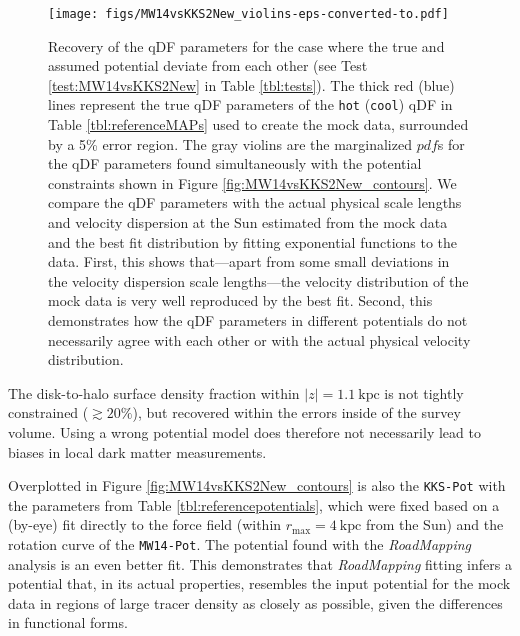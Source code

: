 \documentclass[iop,revtex4,numberedappendix,appendixfloats]{emulateapj}
\newcommand{\pdf}{\ensuremath{pdf}}
\newcommand{\RM}{{\sl RoadMapping}}
\begin{document}
\begin{figure*}[!htbp]
\texttt{[image: figs/MW14vsKKS2New\_violins-eps-converted-to.pdf]}
\caption{Recovery of the qDF parameters for the case where the true and assumed potential deviate from each other (see Test \ref{test:MW14vsKKS2New} in Table \ref{tbl:tests}). The thick red (blue) lines represent the true qDF parameters of the \texttt{hot} (\texttt{cool}) qDF in Table \ref{tbl:referenceMAPs} used to create the mock data, surrounded by a 5\% error region. The gray violins are the marginalized \pdf{}s for the qDF parameters found simultaneously with the potential constraints shown in Figure \ref{fig:MW14vsKKS2New_contours}. We compare the qDF parameters with the actual physical scale lengths and velocity dispersion at the Sun estimated from the mock data and the best fit distribution by fitting exponential functions to the data. First, this shows that---apart from some small deviations in the velocity dispersion scale lengths---the velocity distribution of the mock data is very well reproduced by the best fit. Second, this demonstrates how the qDF parameters in different potentials do not necessarily agree with each other or with the actual physical velocity distribution.}
\label{fig:MW14vsKKS2New_violins}
\end{figure*}

The disk-to-halo surface density fraction within $|z| = 1.1~\text{kpc}$ is not tightly constrained ($\gtrsim20\%$), but recovered within the errors inside of the survey volume. Using a wrong potential model does therefore not necessarily lead to biases in local dark matter measurements.

Overplotted in Figure \ref{fig:MW14vsKKS2New_contours} is also the \texttt{KKS-Pot} with the parameters from Table \ref{tbl:referencepotentials}, which were fixed based on a (by-eye) fit directly to the force field (within $r_\text{max}=4~\text{kpc}$ from the Sun) and the rotation curve of the \texttt{MW14-Pot}. The potential found with the \RM{} analysis is an even better fit. This demonstrates that \RM{} fitting infers a potential that, in its actual properties, resembles the input potential for the mock data in regions of large tracer density as closely as possible, given the differences in functional forms.
\end{document}
